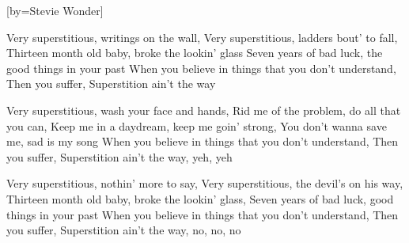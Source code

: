 

[by=Stevie Wonder]


\beginverse
Very superstitious, writings on the wall,
Very superstitious, ladders bout' to fall,
Thirteen month old baby, broke the lookin' glass
Seven years of bad luck, the good things in your past
When you believe in things that you don't understand,
Then you suffer, Superstition ain't the way
\endverse

\beginverse
Very superstitious, wash your face and hands,
Rid me of the problem, do all that you can,
Keep me in a daydream, keep me goin' strong,
You don't wanna save me, sad is my song
When you believe in things that you don't understand,
Then you suffer, Superstition ain't the way, yeh, yeh
\endverse

\beginverse
Very superstitious, nothin' more to say,
Very superstitious, the devil's on his way,
Thirteen month old baby, broke the lookin' glass,
Seven years of bad luck, good things in your past
When you believe in things that you don't understand,
Then you suffer, Superstition ain't the way, no, no, no
\endverse



\chordson
\endsong
